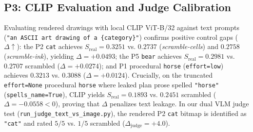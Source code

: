 \documentclass[10pt,twocolumn]{article}
\begin{document}
\subsection{P3: CLIP Evaluation and Judge Calibration}
Evaluating rendered drawings with local CLIP ViT-B/32 against text prompts (\texttt{"an ASCII art drawing of a \{category\}"}) confirms positive control gaps ($\Delta{\uparrow}$): the P2 \texttt{cat} achieves $S_{\text{real}} = 0.3251$ vs. $0.2737$ (\emph{scramble-cells}) and $0.2758$ (\emph{scramble-ink}), yielding $\Delta = +0.0493$; the P5 \texttt{bear} achieves $S_{\text{real}} = 0.2981$ vs. $0.2707$ scrambled ($\Delta = +0.0274$); and P1 procedural \texttt{horse} (\texttt{effort=low}) achieves $0.3213$ vs. $0.3088$ ($\Delta = +0.0124$). Crucially, on the truncated \texttt{effort=None} procedural \texttt{horse} where leaked plan prose spelled \texttt{"horse"} (\texttt{spells\_name=True}), CLIP yields $S_{\text{real}} = 0.1893$ vs. $0.2451$ scrambled ($\Delta = -0.0558 < 0$), proving that $\Delta$ penalizes text leakage. In our dual VLM judge test (\texttt{run\_judge\_text\_vs\_image.py}), the rendered P2 \texttt{cat} bitmap is identified as \texttt{"cat"} and rated $5/5$ vs. $1/5$ scrambled ($\Delta_{\text{judge}} = +4.0$).
\end{document}
